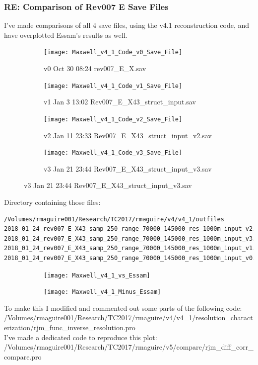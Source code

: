 \documentclass[crop=false,class=book]{standalone}
\begin{document}
\subsubsection{\footnotesize RE: Comparison of Rev007 E Save Files}
I've made comparisons of all 4 save files, using the v4.1 reconstruction code, and have overplotted Essam's results as well.
\begin{figure}[H]
    \centering
    \begin{subfigure}[b]{0.49\textwidth}
        \texttt{[image: Maxwell\_v4\_1\_Code\_v0\_Save\_File]}
        \caption{v0 Oct 30 08:24 rev007\_E\_X.sav}
    \end{subfigure}
    \begin{subfigure}[b]{0.49\textwidth}
        \texttt{[image: Maxwell\_v4\_1\_Code\_v1\_Save\_File]}
        \caption{v1 Jan 3 13:02 Rev007\_E\_X43\_struct\_input.sav}
    \end{subfigure}
    \begin{subfigure}[b]{0.49\textwidth}
        \texttt{[image: Maxwell\_v4\_1\_Code\_v2\_Save\_File]}
        \caption{v2 Jan 11 23:33 Rev007\_E\_X43\_struct\_input\_v2.sav}
    \end{subfigure}
    \begin{subfigure}[b]{0.49\textwidth}
        \texttt{[image: Maxwell\_v4\_1\_Code\_v3\_Save\_File]}
        \caption{v3 Jan 21 23:44 Rev007\_E\_X43\_struct\_input\_v3.sav}
    \end{subfigure}
\end{figure}
Directory containing those files:
\begin{lstlisting}[language=bash,basicstyle=\footnotesize]
/Volumes/rmaguire001/Research/TC2017/rmaguire/v4/v4_1/outfiles
2018_01_24_rev007_E_X43_samp_250_range_70000_145000_res_1000m_input_v2.sav
2018_01_24_rev007_E_X43_samp_250_range_70000_145000_res_1000m_input_v3.sav
2018_01_24_rev007_E_X43_samp_250_range_70000_145000_res_1000m_input_v1.sav
2018_01_24_rev007_E_X43_samp_250_range_70000_145000_res_1000m_input_v0.sav
\end{lstlisting}
\begin{figure}[H]
    \centering
    \begin{subfigure}[b]{0.49\textwidth}
        \texttt{[image: Maxwell\_v4\_1\_vs\_Essam]}
    \end{subfigure}
    \begin{subfigure}[b]{0.49\textwidth}
        \texttt{[image: Maxwell\_v4\_1\_Minus\_Essam]}
    \end{subfigure}
\end{figure}
To make this I modified and commented out some parts of the following code:\\
/Volumes/rmaguire001/Research/TC2017/rmaguire/v4/v4\_1/resolution\_characterization/rjm\_func\_inverse\_resolution.pro\\
I've made a dedicated code to reproduce this plot:\\
/Volumes/rmaguire001/Research/TC2017/rmaguire/v5/compare/rjm\_diff\_corr\_compare.pro
\end{document}
